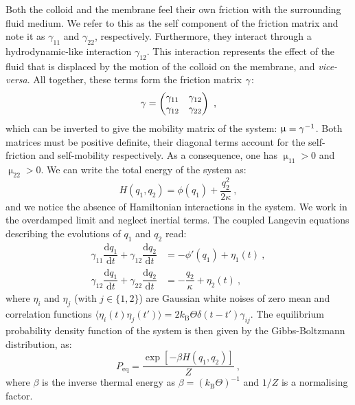 Both the colloid and the membrane feel their own friction with the surrounding fluid medium. We refer to this as the self component of the friction matrix and note it as $\gamma_{11}$ and $\gamma_{22}$, respectively. Furthermore, they interact through a hydrodynamic-like interaction $\gamma_{12}$. This interaction represents the effect of the fluid that is displaced by the motion of the colloid on the membrane, and \emph{vice-versa}. All together, these terms form the friction matrix $\mathbf{\gamma}$:
\begin{equation}
    \mathbf{\gamma} = \begin{pmatrix}
    \gamma_{11} & \gamma_{12} \\
    \gamma_{12} & \gamma_{22}
    \end{pmatrix}~,
\end{equation}
which can be inverted to give the mobility matrix of the system: $\mathbf{\upmu} = \mathbf{\gamma}^{-1}$. Both matrices must be positive definite, their diagonal terms account for the self-friction and self-mobility respectively. As a consequence, one has $\upmu_{11} > 0$ and $\upmu_{22} > 0$. We can write the total energy of the system as:
\begin{equation}
    H (q_1, q_2) = \phi(q_1) + \dfrac{q_2^2}{2\kappa}~,
\end{equation}
and we notice the absence of Hamiltonian interactions in the system. We work in the overdamped limit and neglect inertial terms. The coupled Langevin equations describing the evolutions of $q_1$ and $q_2$ read:
\begin{align}
    \label{3ToyMod_langevin1}
    \gamma_{11}\dfrac{\mathrm{d}q_1}{\mathrm{d}t} + \gamma_{12}\dfrac{\mathrm{d}q_2}{\mathrm{d}t} &= -\phi'(q_1) + \eta_1(t)~, \\
    \gamma_{12}\dfrac{\mathrm{d}q_1}{\mathrm{d}t} + \gamma_{22}\dfrac{\mathrm{d}q_2}{\mathrm{d}t} &= -\dfrac{q_2}{\kappa} + \eta_2(t)~,
    \label{3ToyMod_langevin2}
\end{align}
where $\eta_i$ and $\eta_j$ (with $j \in \{1, 2\}$) are Gaussian white noises of zero mean and correlation functions $\langle \eta_i(t) \eta_j(t')\rangle = 2 k_\mathrm{B}\Theta \delta(t - t')\gamma_{ij}$. The equilibrium probability density function of the system is then given by the Gibbs-Boltzmann distribution, as:
\begin{equation}
    P_\mathrm{eq} = \dfrac{\exp[-\beta H(q_1, q_2)]}{Z}~,
    \label{P_eq}
\end{equation}
where $\beta$ is the inverse thermal energy as $\beta = (k_\mathrm{B}\Theta)^{-1}$ and $1/Z$ is a normalising factor.


